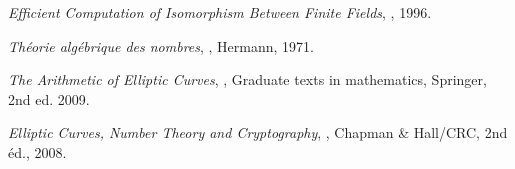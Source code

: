 \documentclass[a4paper]{article} %
\numberwithin{section}{part}
\numberwithin{equation}{section}
\begin{document}
\begin{thebibliography}{LC}
 \emph{Efficient Computation of Isomorphism Between Finite Fields},
, 1996.

 \emph{Théorie algébrique des nombres}, , 
Hermann, 1971.

 \emph{The Arithmetic of Elliptic Curves}, 
, Graduate texts in mathematics, Springer, 2nd ed. 
2009.


 \emph{Elliptic Curves, Number Theory and Cryptography},
, Chapman \& Hall/CRC, 2nd éd., 2008.

\end{thebibliography}
\end{document}
